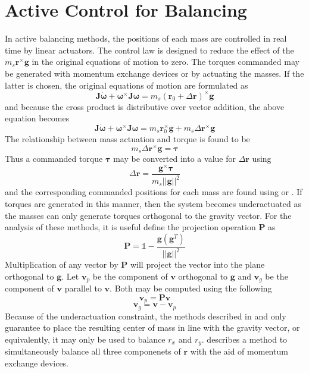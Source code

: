 \section{Active Control for Balancing}

In active balancing methods, the positions of each mass are controlled in real time by linear actuators. The control law is designed to reduce the effect of the $m_s\bm{r}^{\times}\bm{g}$ in the original equations of motion to zero. The torques commanded may be generated with momentum exchange devices or by actuating the masses. If the latter is chosen, the original equations of motion are formulated as
\begin{equation} \label{equation:EomWithTau}
    \bm{J}\dot{\bm{\omega}} + \bm{\omega}^\times \bm{J\omega} 
    = m_s(\bm{r}_0+\Delta\bm{r})^{\times}\bm{g}
\end{equation}
and because the cross product is distributive over vector addition, the above equation becomes
\begin{equation} \label{equation:EomWithTau}
    \bm{J}\dot{\bm{\omega}} + \bm{\omega}^\times \bm{J\omega} 
    = m_s\bm{r}_0^{\times}\bm{g} + m_s\Delta\bm{r}^{\times}\bm{g}
\end{equation}
The relationship between mass actuation and torque is found to be
\begin{equation} 
    m_s\Delta\bm{r}^{\times}\bm{g} = \bm{\tau}
\end{equation}
Thus a commanded torque $\bm{\tau}$ may be converted into a value for $\Delta\bm{r}$ using
\begin{equation}\label{equation:torque_to_del_r}
    \Delta\bm{r}=\frac{\bm{g}^{\times}\bm{\tau}}{m_s||\bm{g}||^2}
\end{equation}
and the corresponding commanded positions for each mass are found using  or . If torques are generated in this manner, then the system becomes underactuated as the masses can only generate torques orthogonal to the gravity vector. For the analysis of these methods, it is useful define the projection operation $\bm{P}$ as
\begin{equation}
    \bm{P}=\mathbb{1}-\frac{\bm{g}(\bm{g}^T)}{||\bm{g}||^2}
\end{equation}
Multiplication of any vector by $\bm{P}$ will project the vector into the plane orthogonal to  $\bm{g}$. Let $\bm{v}_p$ be the component of $\bm{v}$ orthogonal to $\bm{g}$ and $\bm{v}_g$ be the component of $\bm{v}$ parallel to $\bm{v}$. Both may be computed using the following
\begin{equation}
    \bm{v}_p = \bm{Pv}
\end{equation}
\begin{equation}
    \bm{v}_g=\bm{v}-\bm{v}_p
\end{equation}
Because of the underactuation constraint, the methods described in  and  only guarantee to place the resulting center of mass in line with the gravity vector, or equivalently, it may only be used to balance $r_x$ and $r_y$.  describes a method to simultaneously balance all three componenets of $\bm{r}$ with the aid of momentum exchange devices. 

